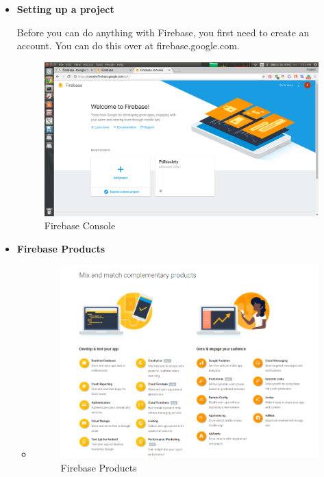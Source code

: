 \begin{itemize}

\item \textbf{Setting up a project}

Before you can do anything with Firebase, you first need to create an account. You can do this over at firebase.google.com.

\begin{figure}[ht]
\centering
\includegraphics[scale=0.20]{images/Pdf2.png}
\caption{Firebase Console}
\end{figure}

 

\item \textbf{Firebase Products}

\begin{itemize}

\item

\begin{figure}[ht]
\centering
\includegraphics[scale=0.4]{images/Pdf1.png}
\caption{Firebase Products}
\end{figure}


\end{itemize}
\end{itemize}
